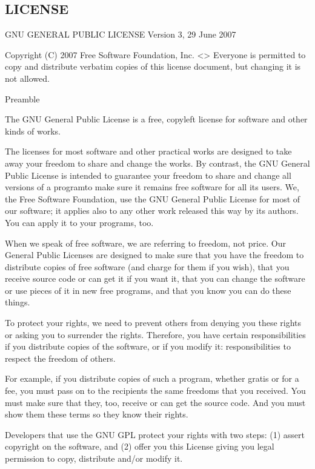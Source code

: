 \documentclass[letterpaper,10pt,english]{sphinxmanual}
\begin{document}
\subsection{LICENSE}
\label{\detokenize{content/misc/LICENSE:license}}\label{\detokenize{content/misc/LICENSE::doc}}
GNU GENERAL PUBLIC LICENSE
Version 3, 29 June 2007

Copyright (C) 2007 Free Software Foundation, Inc. \textless{}\textgreater{}
Everyone is permitted to copy and distribute verbatim copies
of this license document, but changing it is not allowed.

Preamble

The GNU General Public License is a free, copyleft license for
software and other kinds of works.

The licenses for most software and other practical works are designed
to take away your freedom to share and change the works.  By contrast,
the GNU General Public License is intended to guarantee your freedom to
share and change all versions of a program\textendash{}to make sure it remains free
software for all its users.  We, the Free Software Foundation, use the
GNU General Public License for most of our software; it applies also to
any other work released this way by its authors.  You can apply it to
your programs, too.

When we speak of free software, we are referring to freedom, not
price.  Our General Public Licenses are designed to make sure that you
have the freedom to distribute copies of free software (and charge for
them if you wish), that you receive source code or can get it if you
want it, that you can change the software or use pieces of it in new
free programs, and that you know you can do these things.

To protect your rights, we need to prevent others from denying you
these rights or asking you to surrender the rights.  Therefore, you have
certain responsibilities if you distribute copies of the software, or if
you modify it: responsibilities to respect the freedom of others.

For example, if you distribute copies of such a program, whether
gratis or for a fee, you must pass on to the recipients the same
freedoms that you received.  You must make sure that they, too, receive
or can get the source code.  And you must show them these terms so they
know their rights.

Developers that use the GNU GPL protect your rights with two steps:
(1) assert copyright on the software, and (2) offer you this License
giving you legal permission to copy, distribute and/or modify it.
\end{document}
